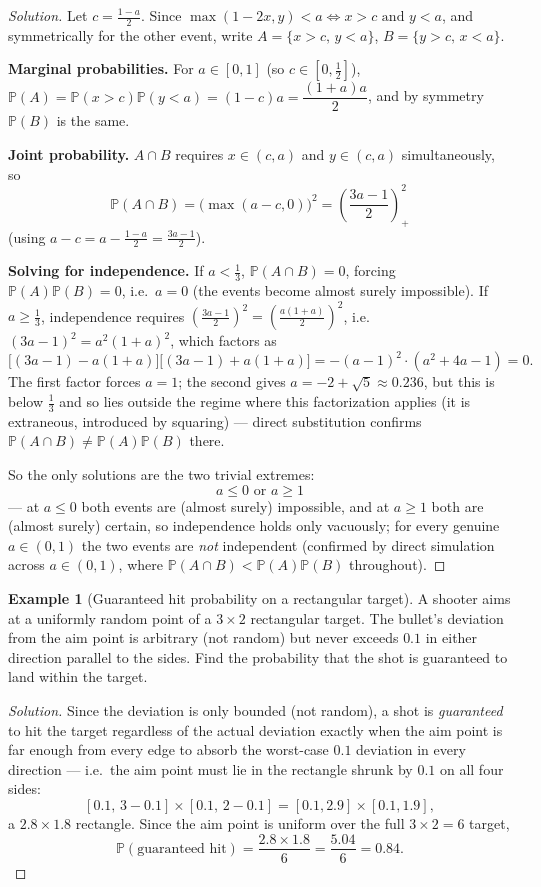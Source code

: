 \documentclass[11pt]{article}
\theoremstyle{definition}
\newtheorem{example}{Example}[section]
\begin{document}
\begin{proof}[Solution]
Let $c=\tfrac{1-a}2$. Since $\max(1-2x,y)<a\iff x>c\text{ and }y<a$, and symmetrically for the other event, write $A=\{x>c,\,y<a\}$, $B=\{y>c,\,x<a\}$.

\textbf{Marginal probabilities.} For $a\in[0,1]$ (so $c\in[0,\tfrac12]$), $\mathbb P(A)=\mathbb P(x>c)\mathbb P(y<a)=(1-c)a=\dfrac{(1+a)a}2$, and by symmetry $\mathbb P(B)$ is the same.

\textbf{Joint probability.} $A\cap B$ requires $x\in(c,a)$ and $y\in(c,a)$ simultaneously, so
\[
\mathbb P(A\cap B)=\bigl(\max(a-c,0)\bigr)^2=\left(\frac{3a-1}2\right)_+^{2}
\]
(using $a-c=a-\tfrac{1-a}2=\tfrac{3a-1}2$).

\textbf{Solving for independence.} If $a<\tfrac13$, $\mathbb P(A\cap B)=0$, forcing $\mathbb P(A)\mathbb P(B)=0$, i.e.\ $a=0$ (the events become almost surely impossible). If $a\ge\tfrac13$, independence requires $\left(\tfrac{3a-1}2\right)^2=\left(\tfrac{a(1+a)}2\right)^2$, i.e.\ $(3a-1)^2=a^2(1+a)^2$, which factors as
\[
\bigl[(3a-1)-a(1+a)\bigr]\bigl[(3a-1)+a(1+a)\bigr]=-(a-1)^2\cdot(a^2+4a-1)=0.
\]
The first factor forces $a=1$; the second gives $a=-2+\sqrt5\approx0.236$, but this is below $\tfrac13$ and so lies outside the regime where this factorization applies (it is extraneous, introduced by squaring) — direct substitution confirms $\mathbb P(A\cap B)\neq\mathbb P(A)\mathbb P(B)$ there.

So the only solutions are the two trivial extremes:
\[
\boxed{a\le0 \text{ or } a\ge1}
\]
— at $a\le0$ both events are (almost surely) impossible, and at $a\ge1$ both are (almost surely) certain, so independence holds only vacuously; for every genuine $a\in(0,1)$ the two events are \emph{not} independent (confirmed by direct simulation across $a\in(0,1)$, where $\mathbb P(A\cap B)<\mathbb P(A)\mathbb P(B)$ throughout).
\end{proof}

\begin{example}[Guaranteed hit probability on a rectangular target]
A shooter aims at a uniformly random point of a $3\times2$ rectangular target. The bullet's deviation from the aim point is arbitrary (not random) but never exceeds $0.1$ in either direction parallel to the sides. Find the probability that the shot is guaranteed to land within the target.
\end{example}

\begin{proof}[Solution]
Since the deviation is only bounded (not random), a shot is \emph{guaranteed} to hit the target regardless of the actual deviation exactly when the aim point is far enough from every edge to absorb the worst-case $0.1$ deviation in every direction — i.e.\ the aim point must lie in the rectangle shrunk by $0.1$ on all four sides:
\[
[0.1,\,3-0.1]\times[0.1,\,2-0.1] = [0.1,2.9]\times[0.1,1.9],
\]
a $2.8\times1.8$ rectangle. Since the aim point is uniform over the full $3\times2=6$ target,
\[
\mathbb P(\text{guaranteed hit})=\frac{2.8\times1.8}{6}=\frac{5.04}{6}=\boxed{0.84}.
\]
\end{proof}
\end{document}
